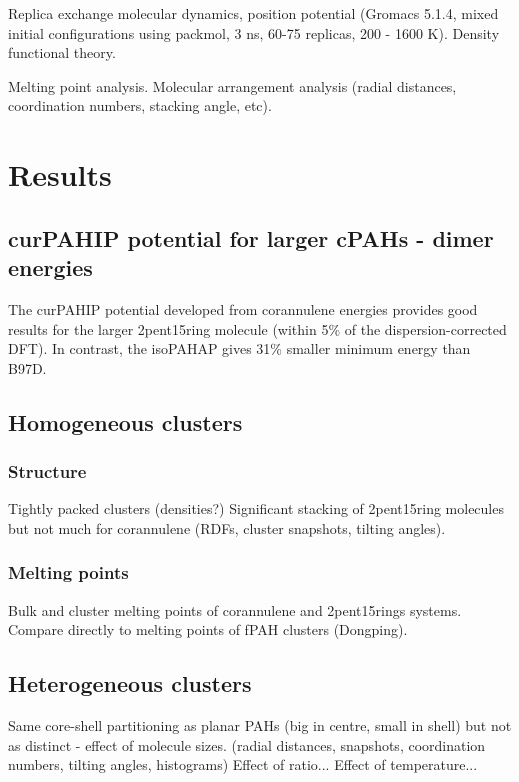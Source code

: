 Replica exchange molecular dynamics, position potential (Gromacs 5.1.4, mixed initial configurations using packmol, 3 ns, 60-75 replicas, 200 - 1600 K).
Density functional theory.

Melting point analysis.
Molecular arrangement analysis (radial distances, coordination numbers, stacking angle, etc).


\section{Results}
\subsection{curPAHIP potential for larger cPAHs - dimer energies}
The curPAHIP potential developed from corannulene energies provides good results for the larger 2pent15ring molecule (within 5\% of the dispersion-corrected DFT). In contrast, the isoPAHAP gives 31\% smaller minimum energy than B97D.

\subsection{Homogeneous clusters}
\subsubsection{Structure}
Tightly packed clusters (densities?)
Significant stacking of 2pent15ring molecules but not much for corannulene (RDFs, cluster snapshots, tilting angles).

\subsubsection{Melting points}
Bulk and cluster melting points of corannulene and 2pent15rings systems.
Compare directly to melting points of fPAH clusters (Dongping).


\subsection{Heterogeneous clusters}
Same core-shell partitioning as planar PAHs (big in centre, small in shell) but not as distinct - effect of molecule sizes. (radial distances, snapshots, coordination numbers, tilting angles, histograms)
Effect of ratio...
Effect of temperature...



